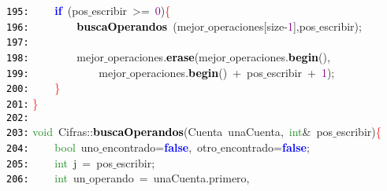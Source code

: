 \documentclass[a4paper,10pt]{scrartcl}
\begin{document}
{   \mbox{}\texttt{\textcolor{Black}{195:}} \ \ \ \ \textbf{\textcolor{Blue}{if}}\ \textcolor{BrickRed}{(}pos$\_$escribir\ \textcolor{BrickRed}{\textgreater{}=}\ \textcolor{Purple}{0}\textcolor{BrickRed}{)}\textcolor{Red}{\{} \\
   \mbox{}\texttt{\textcolor{Black}{196:}} \ \ \ \ \ \ \ \ \textbf{\textcolor{Black}{buscaOperandos}}\ \textcolor{BrickRed}{(}mejor$\_$operaciones\textcolor{BrickRed}{[}size\textcolor{BrickRed}{-}\textcolor{Purple}{1}\textcolor{BrickRed}{],}pos$\_$escribir\textcolor{BrickRed}{);} \\
   \mbox{}\texttt{\textcolor{Black}{197:}} \ \  \\
   \mbox{}\texttt{\textcolor{Black}{198:}} \ \ \ \ \ \ \ \ mejor$\_$operaciones\textcolor{BrickRed}{.}\textbf{\textcolor{Black}{erase}}\textcolor{BrickRed}{(}mejor$\_$operaciones\textcolor{BrickRed}{.}\textbf{\textcolor{Black}{begin}}\textcolor{BrickRed}{(),} \\
   \mbox{}\texttt{\textcolor{Black}{199:}} \ \ \ \ \ \ \ \ \ \ \ \  mejor$\_$operaciones\textcolor{BrickRed}{.}\textbf{\textcolor{Black}{begin}}\textcolor{BrickRed}{()}\ \textcolor{BrickRed}{+}\ pos$\_$escribir\ \textcolor{BrickRed}{+}\ \textcolor{Purple}{1}\textcolor{BrickRed}{);}\ \ \  \\
   \mbox{}\texttt{\textcolor{Black}{200:}} \ \ \ \ \textcolor{Red}{\}} \\
   \mbox{}\texttt{\textcolor{Black}{201:}} \textcolor{Red}{\}} \\
   \mbox{}\texttt{\textcolor{Black}{202:}}  \\
   \mbox{}\texttt{\textcolor{Black}{203:}} \textcolor{ForestGreen}{void}\ Cifras\textcolor{BrickRed}{::}\textbf{\textcolor{Black}{buscaOperandos}}\textcolor{BrickRed}{(}\textcolor{TealBlue}{Cuenta}\ unaCuenta\textcolor{BrickRed}{,}\ \textcolor{ForestGreen}{int}\textcolor{BrickRed}{\&}\ pos$\_$escribir\textcolor{BrickRed}{)}\textcolor{Red}{\{} \\
   \mbox{}\texttt{\textcolor{Black}{204:}} \ \ \ \ \textcolor{ForestGreen}{bool}\ uno$\_$encontrado\textcolor{BrickRed}{=}\textbf{\textcolor{Blue}{false}}\textcolor{BrickRed}{,}\ otro$\_$encontrado\textcolor{BrickRed}{=}\textbf{\textcolor{Blue}{false}}\textcolor{BrickRed}{;} \\
   \mbox{}\texttt{\textcolor{Black}{205:}} \ \ \ \ \textcolor{ForestGreen}{int}\ j\ \textcolor{BrickRed}{=}\ pos$\_$escribir\textcolor{BrickRed}{;} \\
   \mbox{}\texttt{\textcolor{Black}{206:}} \ \ \ \ \textcolor{ForestGreen}{int}\ un$\_$operando\ \textcolor{BrickRed}{=}\ unaCuenta\textcolor{BrickRed}{.}primero\textcolor{BrickRed}{,} \\
}
\end{document}
